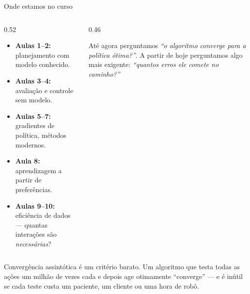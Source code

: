 \documentclass[aspectratio=169, 10pt]{beamer}
\begin{document}
\begin{frame}{Onde estamos no curso}
  \begin{columns}[T]
    \begin{column}{0.52\textwidth}
      \begin{itemize}
        \item \textbf{Aulas 1--2:} planejamento com modelo conhecido.
        \item \textbf{Aulas 3--4:} avaliação e controle sem modelo.
        \item \textbf{Aulas 5--7:} gradientes de política, métodos modernos.
        \item \textbf{Aula 8:} aprendizagem a partir de preferências.
        \item \textbf{Aulas 9--10:} \alert{eficiência de dados} — quantas
              interações são \emph{necessárias}?
      \end{itemize}
    \end{column}
    \begin{column}{0.46\textwidth}
      \begin{ideiabox}
        Até agora perguntamos \emph{``o algoritmo converge para a política
        ótima?''}. A partir de hoje perguntamos algo mais exigente:
        \emph{``quantos erros ele comete no caminho?''}
      \end{ideiabox}
    \end{column}
  \end{columns}

  \bigskip
  \begin{alertabox}
    Convergência assintótica é um critério barato. Um algoritmo que testa
    todas as ações um milhão de vezes cada e depois age otimamente
    ``converge'' — e é inútil se cada teste custa um paciente, um cliente
    ou uma hora de robô.
  \end{alertabox}
\end{frame}
\end{document}
